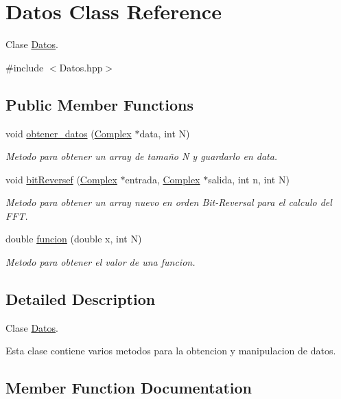 \hypertarget{classDatos}{}\section{Datos Class Reference}
\label{classDatos}


Clase \hyperlink{classDatos}{Datos}.  




{\ttfamily \#include $<$Datos.\+hpp$>$}

\subsection*{Public Member Functions}
\begin{DoxyCompactItemize}
\item 
void \hyperlink{classDatos_ac78505e094f3f4700885bdbc1f606b3f}{obtener\+\_\+datos} (\hyperlink{classComplex}{Complex} $\ast$data, int N)
\begin{DoxyCompactList}\small\item\em Metodo para obtener un array de tamaño N y guardarlo en data. \end{DoxyCompactList}\item 
void \hyperlink{classDatos_a11e17c459622f71bf8c983244668d78e}{bit\+Reversef} (\hyperlink{classComplex}{Complex} $\ast$entrada, \hyperlink{classComplex}{Complex} $\ast$salida, int n, int N)
\begin{DoxyCompactList}\small\item\em Metodo para obtener un array nuevo en orden Bit-\/\+Reversal para el calculo del F\+FT. \end{DoxyCompactList}\item 
double \hyperlink{classDatos_a533dc2344d335ee6b5ac38885442010c}{funcion} (double x, int N)
\begin{DoxyCompactList}\small\item\em Metodo para obtener el valor de una funcion. \end{DoxyCompactList}\end{DoxyCompactItemize}


\subsection{Detailed Description}
Clase \hyperlink{classDatos}{Datos}. 

Esta clase contiene varios metodos para la obtencion y manipulacion de datos. 

\subsection{Member Function Documentation}
\mbox{\label{classDatos_a11e17c459622f71bf8c983244668d78e}} 
